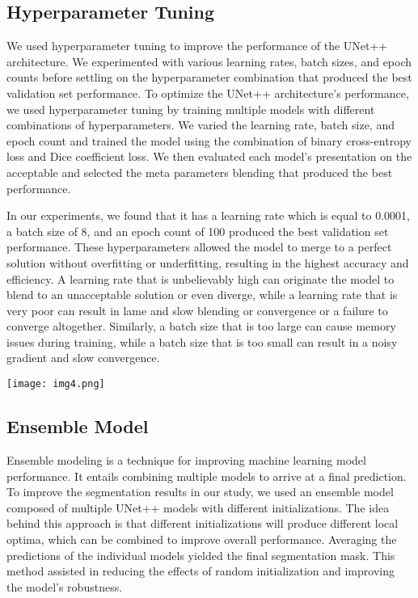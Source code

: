 \documentclass[conference]{IEEEtran}
\begin{document}
\subsection{Hyperparameter Tuning}\label{SCM}
We used hyperparameter tuning to improve the performance of the UNet++ architecture. We experimented with various learning rates, batch sizes, and epoch counts before settling on the hyperparameter combination that produced the best validation set performance. To optimize the UNet++ architecture's performance, we used hyperparameter tuning by training multiple models with different combinations of hyperparameters. We varied the learning rate, batch size, and epoch count and trained the model using the combination of binary cross-entropy loss and Dice coefficient loss. We then evaluated each model's presentation on the acceptable and selected the meta parameters blending that produced the best performance.

In our experiments, we found that it has a learning rate which is equal to 0.0001, a batch size of 8, and an epoch count of 100 produced the best validation set performance. These hyperparameters allowed the model to merge to a perfect solution without overfitting or underfitting, resulting in the highest accuracy and efficiency. A learning rate that is unbelievably high can originate the model to blend to an unacceptable solution or even diverge, while a learning rate that is very poor can result in lame and slow blending or convergence or a failure to converge altogether. Similarly, a batch size that is too large can cause memory issues during training, while a batch size that is too small can result in a noisy gradient and slow convergence.

\texttt{[image: img4.png]}
\subsection{Ensemble Model}\label{SCM}
Ensemble modeling is a technique for improving machine learning model performance. It entails combining multiple models to arrive at a final prediction. To improve the segmentation results in our study, we used an ensemble model composed of multiple UNet++ models with different initializations. The idea behind this approach is that different initializations will produce different local optima, which can be combined to improve overall performance. Averaging the predictions of the individual models yielded the final segmentation mask. This method assisted in reducing the effects of random initialization and improving the model's robustness.
\end{document}
